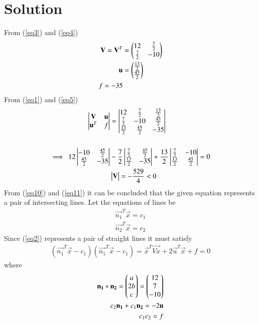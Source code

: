 \documentclass[journal,12pt,twocolumn]{IEEEtran}
\begin{document}
\section{Solution}
From (\ref{eq3}) and (\ref{eq4})
\begin{align}
	\mathbf{V}=\mathbf{V}^T &= \begin{pmatrix}12 & \frac{7}{2} \\ \frac{7}{2} & -10\end{pmatrix} \\
	\mathbf{u} &= \begin{pmatrix}\frac{13}{2} \\ \frac{45}{2}\end{pmatrix} \\
	 f=-35
\end{align}
From (\ref{eq1}) and (\ref{eq5})
\begin{align}
	\mydet{\vec{V} & \vec{u} \\ \vec{u}^T & f} 
		&= \mydet{12 & \frac{7}{2}  & \frac{13}{2} \\ 
	        \frac{7}{2} & -10 & \frac{45}{2}     \\
	       \frac{13}{2} & \frac{45}{2} & -35 }  \\
	       		\nonumber \\
	\implies \ 12\mydet{-10 & \frac{45}{2} \\ \frac{45}{2} & -35} 
		& -\frac{7}{2}\mydet{\frac{7}{2} & \frac{45}{2} \\ \frac{13}{2} & -35} 
		+\frac{13}{2}\mydet{\frac{7}{2} & -10 \\ \frac{13}{2} & \frac{45}{2}} = 0 \label{eq10}\\
	& \mydet{\vec{V}}=-\frac{529}{4} < 0 \label{eq11}
\end{align}
From (\ref{eq10}) and (\ref{eq11}) it can be concluded that the given equation represents a pair of intersecting lines.
Let the equations of lines be
\begin{align}
	\vec{n_1}^T \vec{x}=c_1 \\
	\vec{n_2}^T \vec{x}=c_2 
\end{align}
Since (\ref{eq2}) represents a pair of straight lines it must satisfy
\begin{align}
	(\vec{n_1}^T \vec{x} - c_1)(\vec{n_1}^T \vec{x} - c_1) =
        \vec{x}^{T}\vec{Vx} + 2\vec{u}^{T}\vec{x} + f=0
\end{align}
where
\begin{align}
	\vec{n_1}*\vec{n_2}=\myvec{a\\2b\\c}=\myvec{12\\7\\-10} \label{eq6} \\ 
	c_2\vec{n_1}+c_1\vec{n_2}=-2\vec{u} \label{eq9}\\
	c_1c_2=f
\end{align}
\end{document}
